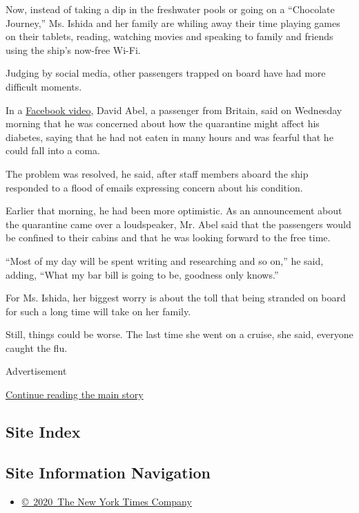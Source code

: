 Now, instead of taking a dip in the freshwater pools or going on a
``Chocolate Journey,'' Ms. Ishida and her family are whiling away their
time playing games on their tablets, reading, watching movies and
speaking to family and friends using the ship's now-free Wi-Fi.

Judging by social media, other passengers trapped on board have had more
difficult moments.

In a
\href{https://www.facebookcorewwwi.onion/david.abel.75/videos/10220590641298141/}{Facebook
video}, David Abel, a passenger from Britain, said on Wednesday morning
that he was concerned about how the quarantine might affect his
diabetes, saying that he had not eaten in many hours and was fearful
that he could fall into a coma.

The problem was resolved, he said, after staff members aboard the ship
responded to a flood of emails expressing concern about his condition.

Earlier that morning, he had been more optimistic. As an announcement
about the quarantine came over a loudspeaker, Mr. Abel said that the
passengers would be confined to their cabins and that he was looking
forward to the free time.

``Most of my day will be spent writing and researching and so on,'' he
said, adding, ``What my bar bill is going to be, goodness only knows.''

For Ms. Ishida, her biggest worry is about the toll that being stranded
on board for such a long time will take on her family.

Still, things could be worse. The last time she went on a cruise, she
said, everyone caught the flu.

Advertisement

\protect\hyperlink{after-bottom}{Continue reading the main story}

\hypertarget{site-index}{%
\subsection{Site Index}\label{site-index}}

\hypertarget{site-information-navigation}{%
\subsection{Site Information
Navigation}\label{site-information-navigation}}

\begin{itemize}
\tightlist
\item
  \href{https://help.nytimes3xbfgragh.onion/hc/en-us/articles/115014792127-Copyright-notice}{©~2020~The
  New York Times Company}
\end{itemize}

